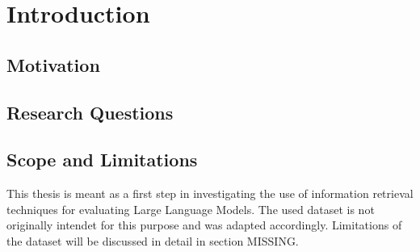 \chapter{Introduction}\label{structure}



\section{Motivation}\label{sec:motivation}

\section{Research Questions}\label{sec:research-question}


\section{Scope and Limitations}\label{sec:scope-and-limitations}
This thesis is meant as a first step in investigating the use of information retrieval techniques for evaluating Large Language Models.
The used dataset is not originally intendet for this purpose and was adapted accordingly.
Limitations of the dataset will be discussed in detail in section MISSING.


